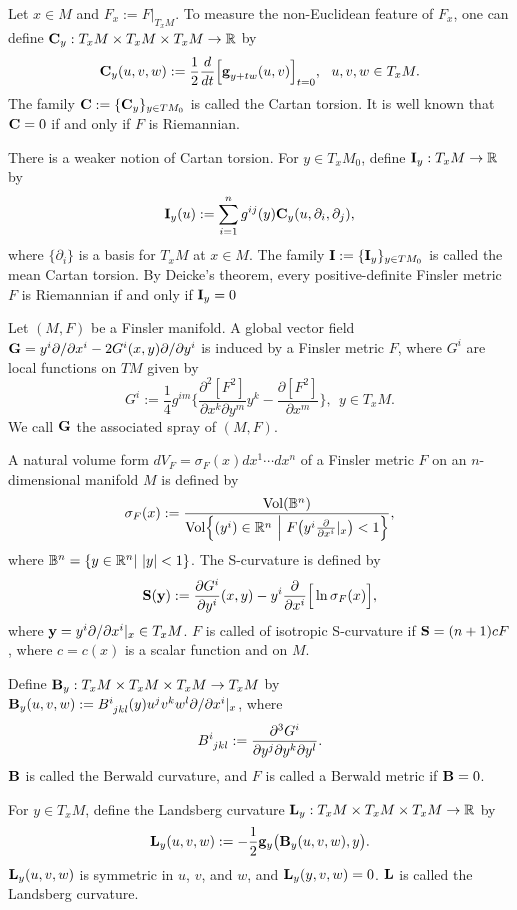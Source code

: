 \documentclass[12pt,a4paper]{article}
\theoremstyle{definition}
\newcommand{\pa}{{\partial}}
\newcommand{\pxi}{{\pa \over \pa x^i}}
\numberwithin{equation}{section}
\begin{document}
Let  $x\in M$ and $F_x:=F|_{T_xM}$.  To measure the non-Euclidean feature of $F_x$, one can define ${\bf C}_y:T_xM\times T_xM\times T_xM\rightarrow \mathbb{R}$ by
\[
{\bf C}_{y}(u,v,w):={1 \over 2} \frac{d}{dt}\Big[\textbf{g}_{y+tw}(u,v)
\Big]_{t=0}, \ \ u,v,w\in T_xM.
\]
The family ${\bf C}:=\{{\bf C}_y\}_{y\in TM_0}$  is called the Cartan torsion. It is well known that ${\bf{C}}=0$ if and
only if $F$ is Riemannian.


There is a weaker notion of Cartan torsion. For   $y\in T_x M_0$, define ${\bf I}_y:T_xM\rightarrow \mathbb{R}$ by
\[
{\bf I}_y(u):=\sum^n_{i=1}g^{ij}(y) {\bf C}_y(u, \partial_i, \partial_j),
\]
where $\{\partial_i\}$ is a basis for $T_xM$ at  $x\in M$. The family ${\bf I}:=\{{\bf I}_y\}_{y\in TM_0}$  is called the mean Cartan torsion.  By Deicke's  theorem, every positive-definite Finsler metric  $F$ is Riemannian  if and only if ${\bf I}_y=0$

\bigskip
Let $(M, F)$ be a  Finsler manifold. A global vector field ${\bf{G}}=y^i {{\partial} / {\partial x^i}}-2G^i(x,y){{\partial} /
{\partial y^i}}$ is
induced by a Finsler metric $F$, where $G^i$ are local functions on $TM$ given by
\[
G^i:=\frac{1}{4}g^{im}\Big\{\frac{\partial^2[F^2]}{\partial x^k
\partial y^m}y^k-\frac{\partial[F^2]}{\partial x^m}\Big\},\ \
y\in T_xM.
\]
We call $\bf{G}$  the  associated spray of $(M,F)$.


A natural volume form $dV_F = \sigma_F(x) dx^1 \cdots
dx^n$ of a Finsler metric $F$ on an $n$-dimensional manifold $M$ is defined by
\[
\sigma_F(x) := {{\rm Vol} (\Bbb B^n)
\over {\rm Vol} \Big \{ (y^i)\in \mathbb{R}^n \ \Big | \ F \big ( y^i
\pxi|_x \big ) < 1 \Big \} },
\]
where $\Bbb B^n=\{y\in\mathbb{R}^n|\,\, |y|<1\}$.  The S-curvature is defined by
\[
 {\bf S}({\bf y}) := {\pa G^i\over \pa y^i}(x,y) - y^i {\pa \over \pa x^i}
\Big [ \ln \sigma_F (x)\Big ],
\]
where ${\bf y}=y^i\partial/\partial x^i|_x\in T_xM$.  $F$ is called of  isotropic S-curvature if ${\bf S}= (n+1) c F$, where $c= c(x)$ is a scalar function and  on $M$.

\smallskip

Define ${\bf B}_y:T_xM\times T_xM \times T_xM\rightarrow T_xM$  by ${\bf B}_y(u, v, w):=B^i_{\ jkl}(y)u^jv^kw^l{{\partial }/ {\partial x^i}}|_x$, where
\[
B^i_{\ jkl}:={{\partial^3 G^i} \over {\partial y^j \partial y^k \partial y^l}}.
\]
$\bf B$ is called the Berwald curvature, and $F$ is called a Berwald metric if ${\bf{B}}=0$.




\bigskip
For $y\in T_xM$, define the Landsberg curvature ${\bf L}_y:T_xM\times T_xM \times T_xM\rightarrow \mathbb{R}$  by
\[
{\bf L}_y(u, v,w):=-\frac{1}{2}{\bf g}_y\big({\bf B}_y(u, v, w), y\big).
\]
${\bf L}_y(u, v, w)$ is symmetric in $u$, $v$, and $w$, and  ${\bf L}_y(y, v, w)=0$. $\bf L$ is called the
Landsberg curvature.
\bigskip
\end{document}
